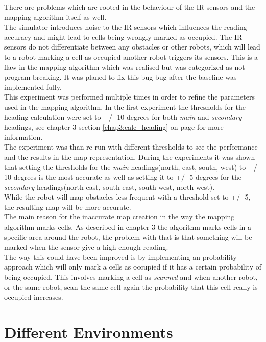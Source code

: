 There are problems which are rooted in the behaviour of the IR sensors and the mapping algorithm itself as well.\\
The simulator introduces noise to the IR sensors which influences the reading accuracy and might lead to cells being wrongly marked as occupied. 
The IR sensors do not differentiate between any obstacles or other robots, 
which will lead to a robot marking a cell as occupied another robot triggers its sensors. This is a flaw in the mapping algorithm which was realised but was categorized as not program breaking. It was planed to fix this bug bug after the baseline was implemented fully. \\ 

This experiment was performed multiple times in order to refine the parameters used in the mapping algorithm. In the first experiment the thresholds for the heading calculation were set to +/- 10 degrees for both \textit{main} and \textit{secondary} headings, see chapter 3 section \ref{chap3:calc_heading} on page \pageref{chap3:calc_heading} for more information. \\
The experiment was than re-run with different thresholds to see the performance and the results in the map representation. 
During the experiments it was shown that setting the thresholds for the \textit{main} headings(north, east, south, west) to +/- 10 degrees is the most accurate as well as setting it to +/- 5 degrees for the \textit{secondary} headings(north-east, south-east, south-west, north-west).\\
While the robot will map obstacles less frequent with a threshold set to +/- 5, the resulting map will be more accurate. \\

The main reason for the inaccurate map creation in the way the mapping algorithm marks cells. As described in chapter 3 the algorithm marks cells in a specific area around the robot, the problem with that is that something will be marked when the sensor give a high enough reading. \\
The way this could have been improved is by implementing an probability approach which will only mark a cells as occupied if it has a certain probability of being occupied. This involves marking a cell as \textit{scanned} and when another robot, or the same robot, scan the same cell again the probability that this cell really is occupied increases. 

\section{Different Environments}
